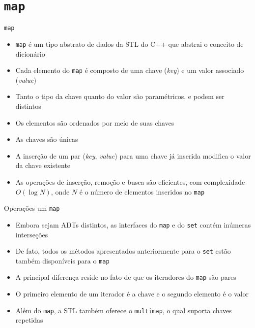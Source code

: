 \section{\texttt{map}}

\begin{frame}[fragile]{\texttt{map}}

    \begin{itemize}
        \item \texttt{map} é um tipo abstrato de dados da STL do C++ que abstrai o conceito de
            dicionário

        \item Cada elemento do \texttt{map} é composto de uma chave (\textit{key}) e um valor
            associado (\textit{value})

        \item Tanto o tipo da chave quanto do valor são paramétricos, e podem ser distintos

        \item Os elementos são ordenados por meio de suas chaves

        \item As chaves são únicas

        \item A inserção de um par (\textit{key}, \textit{value}) para uma chave já inserida 
            modifica o valor da chave existente

        \item As operações de inserção, remoção e busca são eficientes, com complexidade
            $O(\log N)$, onde $N$ é o número de elementos inseridos no \texttt{map}
    \end{itemize}

\end{frame}

\begin{frame}[fragile]{Operações um \texttt{map}}

    \begin{itemize}
        \item Embora sejam ADTs distintos, as interfaces do \texttt{map} e do \texttt{set}
            contém inúmeras interseções

        \item De fato, todos os métodos apresentados anteriormente para o \texttt{set} estão
            também disponíveis para o \texttt{map}

        \item A principal diferença reside no fato de que os iteradores do \texttt{map} são
            pares 

        \item O primeiro elemento de um iterador é a chave e o segundo elemento é o valor

        \item Além do \texttt{map}, a STL também oferece o \texttt{multimap}, o qual suporta
            chaves repetidas
            
    \end{itemize}

\end{frame}

